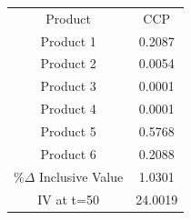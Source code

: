 \begin{tabular}{cc}
Product & CCP \\
Product 1 & 0.2087 \\
Product 2 & 0.0054 \\
Product 3 & 0.0001 \\
Product 4 & 0.0001 \\
Product 5 & 0.5768 \\
Product 6 & 0.2088 \\
$\%\Delta$ Inclusive Value & 1.0301 \\
IV at t=50 & 24.0019 \\
\end{tabular}
